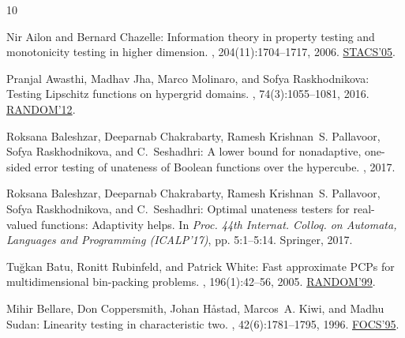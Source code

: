 \documentclass[11pt]{article}
\numberwithin{equation}{section}
\theoremstyle{definition}
\theoremstyle{plain}
\begin{document}
\tocrefpdfbookmark
\begin{thebibliography}{10}

{\sc Nir Ailon and Bernard Chazelle}: Information theory in property testing
  and monotonicity testing in higher dimension.
, 204(11):1704--1717, 2006.
\newblock \prelim
  \href{https://doi.org/10.1007/978-3-540-31856-9\_36}{STACS'05}.
\newblock [\epfmtdoi{10.1016/j.ic.2006.06.001}]

{\sc Pranjal Awasthi, Madhav Jha, Marco Molinaro, and Sofya Raskhodnikova}:
  Testing {Lipschitz} functions on hypergrid domains.
, 74(3):1055--1081, 2016.
\newblock \prelim
  \href{http://doi.org/10.1007/978-3-642-32512-0\_33}{RANDOM'12}.
\newblock [\epfmtdoi{10.1007/s00453-015-9984-y}]

{\sc Roksana Baleshzar, Deeparnab Chakrabarty, Ramesh Krishnan~S. Pallavoor,
  Sofya Raskhodnikova, and C.~Seshadhri}: A lower bound for nonadaptive,
  one-sided error testing of unateness of {Boolean} functions over the
  hypercube.
, 2017.

{\sc Roksana Baleshzar, Deeparnab Chakrabarty, Ramesh Krishnan~S. Pallavoor,
  Sofya Raskhodnikova, and C.~Seshadhri}: Optimal unateness testers for
  real-valued functions: Adaptivity helps.
\newblock In {\em Proc. 44th Internat. Colloq. on Automata, Languages and
  Programming (ICALP'17)}, pp. 5:1--5:14. Springer, 2017.

{\sc Tu\u{g}kan Batu, Ronitt Rubinfeld, and Patrick White}: Fast approximate
  {PCP}s for multidimensional bin-packing problems.
, 196(1):42--56, 2005.
\newblock \prelim
  \href{https://doi.org/10.1007/978-3-540-48413-4\_25}{RANDOM'99}.
\newblock [\epfmtdoi{10.1016/j.ic.2004.10.001}]

{\sc Mihir Bellare, Don Coppersmith, Johan H{\aa}stad, Marcos~A. Kiwi, and
  Madhu Sudan}: Linearity testing in characteristic two.
, 42(6):1781--1795, 1996.
\newblock \prelim \href{http://doi.org/10.1109/SFCS.1995.492574}{FOCS'95}.
\newblock [\epfmtdoi{10.1109/18.556674}]


\end{thebibliography}
\end{document}
